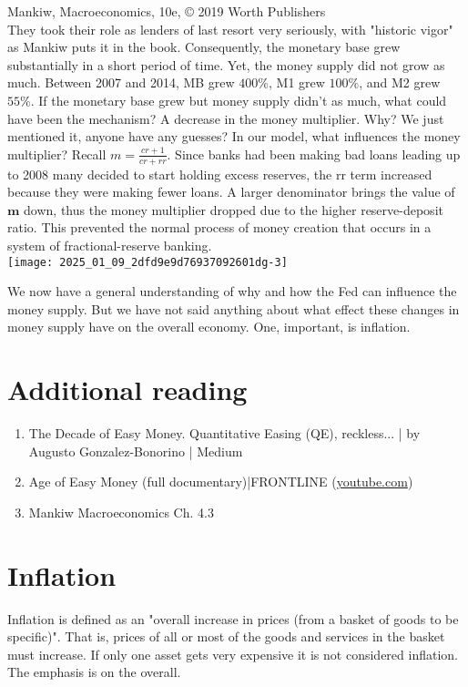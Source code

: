 \documentclass[10pt]{article}
\begin{document}
Mankiw, Macroeconomics, 10e, © 2019 Worth Publishers\\
They took their role as lenders of last resort very seriously, with "historic vigor" as Mankiw puts it in the book. Consequently, the monetary base grew substantially in a short period of time. Yet, the money supply did not grow as much. Between 2007 and 2014, MB grew $400 \%$, M1 grew $100 \%$, and M2 grew $55 \%$. If the monetary base grew but money supply didn't as much, what could have been the mechanism? A decrease in the money multiplier. Why? We just mentioned it, anyone have any guesses? In our model, what influences the money multiplier? Recall $m=\frac{c r+1}{c r+r r}$. Since banks had been making bad loans leading up to 2008 many decided to start holding excess reserves, the rr term increased because they were making fewer loans. A larger denominator brings the value of $\mathbf{m}$ down, thus the money multiplier dropped due to the higher reserve-deposit ratio. This prevented the normal process of money creation that occurs in a system of fractional-reserve banking.\\
\texttt{[image: 2025\_01\_09\_2dfd9e9d76937092601dg-3]}

We now have a general understanding of why and how the Fed can influence the money supply. But we have not said anything about what effect these changes in money supply have on the overall economy. One, important, is inflation.

\section*{Additional reading}
\begin{enumerate}
  \item The Decade of Easy Money. Quantitative Easing (QE), reckless... | by Augusto Gonzalez-Bonorino | Medium
  \item Age of Easy Money (full documentary)|FRONTLINE (\href{http://youtube.com}{youtube.com})
  \item Mankiw Macroeconomics Ch. 4.3
\end{enumerate}

\section*{Inflation}
Inflation is defined as an "overall increase in prices (from a basket of goods to be specific)". That is, prices of all or most of the goods and services in the basket must increase. If only one asset gets very expensive it is not considered inflation. The emphasis is on the overall.
\end{document}
